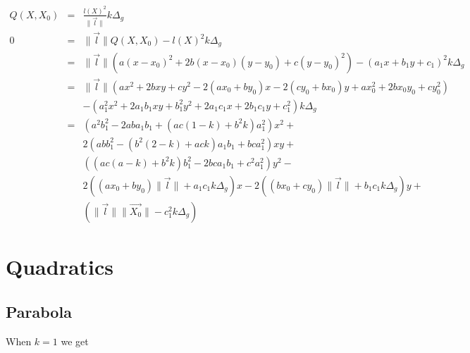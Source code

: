 \documentclass{article}
\begin{document}
\begin{eqnarray}
Q(X, X_0)  & = & \frac{l(X)^2}{\|\vec{l}\|}k\Delta_g\\
0 & = & \|\vec{l}\|Q(X, X_0) - l(X)^2k\Delta_g\\
  & = & \|\vec{l}\|(a(x - x_0)^2 + 2b(x - x_0)(y - y_0) + c(y - y_0)^2) - (a_1x + b_1y + c_1)^2k\Delta_g\nonumber\\
  & = & \|\vec{l}\|(ax^2 + 2bxy + cy^2  - 2(ax_0 + by_0)x - 2(cy_0 + bx_0)y + ax_0^2 + 2bx_0y_0 + cy_0^2) \nonumber\\
  &   & - (a_1^2x^2 + 2a_1b_1xy + b_1^2y^2 + 2a_1c_1x + 2b_1c_1y + c_1^2)k\Delta_g\nonumber\\
  & = & (a^2b_1^2 - 2aba_1b_1 + (ac(1 - k) + b^2k)a_1^2)x^2 + \nonumber\\
  &   & 2(abb_1^2 - (b^2(2 - k) + ack)a_1b_1 + bca_1^2)xy + \nonumber\\
  &   & ((ac(a-k) + b^2k)b_1^2 - 2bca_1b_1 + c^2a_1^2)y^2 - \nonumber\\
  &   & 2((ax_0 + by_0)\|\vec{l}\| + a_1c_1k\Delta_g)x - 2((bx_0 + cy_0)\|\vec{l}\| + b_1c_1k\Delta_g)y + \nonumber\\
  &   & (\|\vec{l}\|\|\vec{X_0}\| - c_1^2k\Delta_g)
\end{eqnarray}

\section{Quadratics}

\subsection{Parabola}

When $k = 1$ we get
\end{document}
